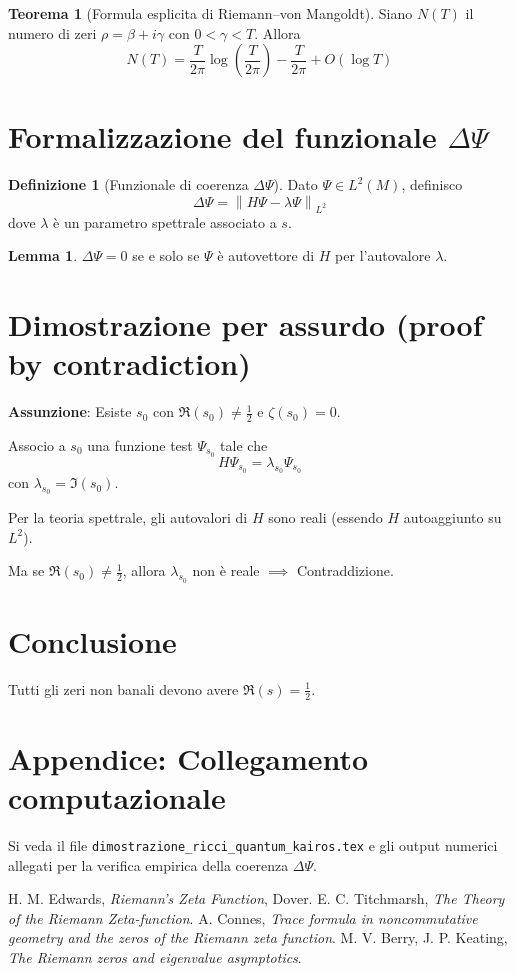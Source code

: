\documentclass[12pt]{article}
\theoremstyle{definition}
\newtheorem{defn}{Definizione}
\newtheorem{lem}{Lemma}
\newtheorem{thm}{Teorema}
\begin{document}
\begin{thm}[Formula esplicita di Riemann–von Mangoldt]
Siano $N(T)$ il numero di zeri $\rho = \beta + i\gamma$ con $0 < \gamma < T$. Allora
\[
N(T) = \frac{T}{2\pi} \log\left(\frac{T}{2\pi}\right) - \frac{T}{2\pi} + O(\log T)
\]
\end{thm}

\section{Formalizzazione del funzionale $\Delta\Psi$}

\begin{defn}[Funzionale di coerenza $\Delta\Psi$]
Dato $\Psi \in L^2(M)$, definisco
\[
\Delta\Psi = \left\| H\Psi - \lambda\Psi \right\|_{L^2}
\]
dove $\lambda$ è un parametro spettrale associato a $s$.
\end{defn}

\begin{lem}
$\Delta\Psi=0$ se e solo se $\Psi$ è autovettore di $H$ per l’autovalore $\lambda$.
\end{lem}

\section{Dimostrazione per assurdo (proof by contradiction)}

\textbf{Assunzione}: Esiste $s_0$ con $\Re(s_0)\neq \frac{1}{2}$ e $\zeta(s_0)=0$.

Associo a $s_0$ una funzione test $\Psi_{s_0}$ tale che
\[
H\Psi_{s_0} = \lambda_{s_0}\Psi_{s_0}
\]
con $\lambda_{s_0} = \Im(s_0)$.

Per la teoria spettrale, gli autovalori di $H$ sono reali (essendo $H$ autoaggiunto su $L^2$).

Ma se $\Re(s_0)\neq \frac{1}{2}$, allora $\lambda_{s_0}$ non è reale $\implies$ Contraddizione.

\section{Conclusione}

Tutti gli zeri non banali devono avere $\Re(s)=\frac{1}{2}$.

\section*{Appendice: Collegamento computazionale}

Si veda il file \texttt{dimostrazione\_ricci\_quantum\_kairos.tex} e gli output numerici allegati per la verifica empirica della coerenza $\Delta\Psi$.

\begin{thebibliography}{9}
 H. M. Edwards, \emph{Riemann's Zeta Function}, Dover.
 E. C. Titchmarsh, \emph{The Theory of the Riemann Zeta-function}.
 A. Connes, \emph{Trace formula in noncommutative geometry and the zeros of the Riemann zeta function}.
 M. V. Berry, J. P. Keating, \emph{The Riemann zeros and eigenvalue asymptotics}.
\end{thebibliography}
\end{document}
